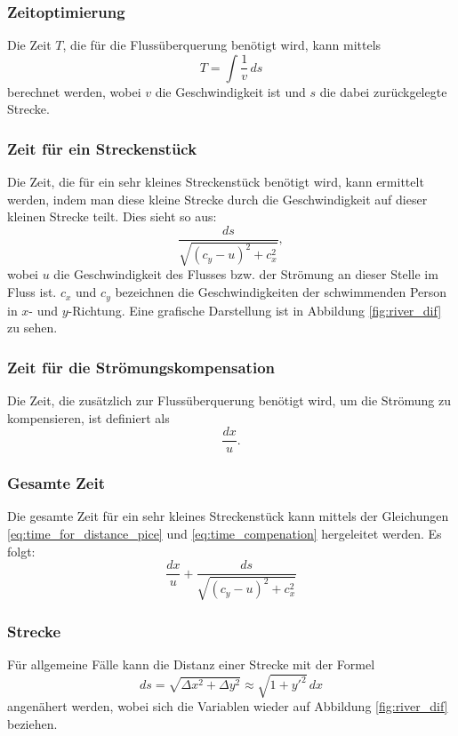 \subsubsection{Zeitoptimierung} Die Zeit \(T\), die für die Flussüberquerung benötigt wird, kann mittels
\[
T = \int \frac{1}{v} \, ds
\]
berechnet werden, wobei \(v\) die Geschwindigkeit ist und \(s\) die dabei zurückgelegte Strecke.

\subsubsection{Zeit für ein Streckenstück} Die Zeit, die für ein sehr kleines Streckenstück benötigt wird, kann ermittelt werden, indem man diese kleine Strecke durch die Geschwindigkeit auf dieser kleinen Strecke teilt. Dies sieht so aus:
\begin{equation}\label{eq:time_for_distance_pice}
    \frac{ds}{\sqrt{(c_y - u)^2 + c_x^2}},
\end{equation}
wobei \(u\) die Geschwindigkeit des Flusses bzw. der Strömung an dieser Stelle im Fluss ist. \(c_x\) und \(c_y\) bezeichnen die Geschwindigkeiten der schwimmenden Person in \(x\)- und \(y\)-Richtung. Eine grafische Darstellung ist in Abbildung \ref{fig:river_dif} zu sehen.

\subsubsection{Zeit für die Strömungskompensation} Die Zeit, die zusätzlich zur Flussüberquerung benötigt wird, um die Strömung zu kompensieren, ist definiert als 
\begin{equation}\label{eq:time_compenation}
    \frac{dx}{u}.
\end{equation}

\subsubsection{Gesamte Zeit} Die gesamte Zeit für ein sehr kleines Streckenstück kann mittels der Gleichungen \eqref{eq:time_for_distance_pice} und \eqref{eq:time_compenation} hergeleitet werden. Es folgt:
\begin{equation}\label{eq:time_pice_total}
    \frac{dx}{u} + \frac{ds}{\sqrt{(c_y - u)^2 + c_x^2}}
\end{equation}

\subsubsection{Strecke}
Für allgemeine Fälle kann die Distanz einer Strecke mit der Formel
\[
ds = \sqrt{\Delta x^2 + \Delta y^2} \approx \sqrt{1 + y'^2} \, dx
\]
angenähert werden, wobei sich die Variablen wieder auf Abbildung \ref{fig:river_dif} beziehen.

